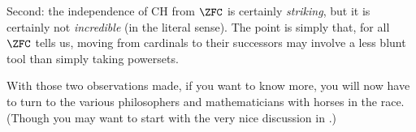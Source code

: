 \documentclass[../../../include/open-logic-section]{subfiles}
\begin{document}
Second: the independence of CH from $\ZFC$ is certainly \emph{striking}, but it is certainly not \emph{incredible} (in the literal sense). The point is simply that, for all $\ZFC$ tells us, moving from cardinals to their successors may involve a less blunt tool than simply taking powersets.

With those two observations made, if you want to know more, you will now have to turn to the various philosophers and mathematicians with horses in the race. (Though you may want to start with the very nice discussion in \citeauthor{Potter2004} \citeyear[\S15.6]{Potter2004}.) 
\end{document}
